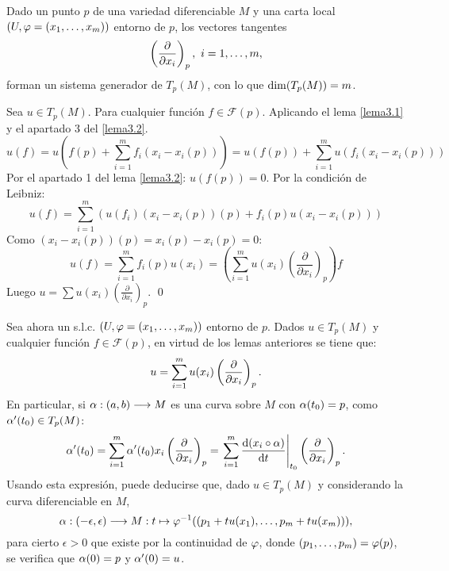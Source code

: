 \documentclass[Cursovd_portada.tex]{subfiles}
\begin{document}
\begin{lemma}\label{lema3.3}
Dado un punto $p$ de una variedad diferenciable $M$ y una carta local $(U,\varphi=(x_1,\dots ,x_m))$ entorno de $p$,
los vectores tangentes
$$\left(\displaystyle{\frac{\partial}{\partial x_i}}\right)_p,\mbox{ }i=1,\dots ,m,$$
forman un sistema generador de $T_p(M)$, con lo que ${\rm dim}(T_p(M))=m$.
\end{lemma}
\begin{dem}
Sea $u \in T_p(M)$. Para cualquier función $f \in \mathcal{F}(p)$. Aplicando el lema \ref{lema3.1} y el apartado 3 del \ref{lema3.2}.
\[ u(f) = u(f(p)+\sum_{i=1}^m f_i(x_i-x_i(p))) = u(f(p)) + \sum_{i=1}^m u(f_i(x_i-x_i(p))) \]
Por el apartado 1 del lema \ref{lema3.2}: $u(f(p))=0$. Por la condición de Leibniz:
\[ u(f) = \sum_{i=1}^m ( u(f_i)(x_i-x_i(p))(p) + f_i(p) u(x_i-x_i(p))) \]
Como $(x_i-x_i(p))(p)=x_i(p)-x_i(p)=0$:
\[ u(f) = \sum_{i=1}^m f_i(p) u(x_i) = \left(\sum_{i=1}^m u(x_i) \left(\frac{\partial}{\partial x_i}\right)_p\right)f \]
Luego $u = \sum u(x_i) \left(\frac{\partial}{\partial x_i}\right)_p$.
\qed
\end{dem}
Sea ahora un s.l.c. $(U,\varphi=(x_1,\dots ,x_m))$ entorno de $p$. Dados $u\in T_p(M)$ y cualquier función
$f\in\mathcal{F}(p)$, en virtud de los lemas anteriores se tiene que:
$$u=\sum_{i=1}^mu(x_i)\left(\displaystyle{\frac{\partial}{\partial x_i}}\right)_p.$$
\hs En particular, si $\alpha:(a,b)\longrightarrow M$ es una curva sobre $M$ con $\alpha(t_0)=p$, como $\alpha'(t_0)\in T_p(M)$:
$$\alpha'(t_0)=\sum_{i=1}^m\alpha'(t_0)x_i\left(\displaystyle{\frac{\partial}{\partial x_i}}\right)_p=
\left.\sum_{i=1}^m\displaystyle{\frac{{\rm d} (x_i\circ\alpha)}{{\rm d} t}}\right|_{t_0}\left(\displaystyle{\frac{\partial}{\partial x_i}}\right)_p.$$ \hs Usando esta expresión, puede
deducirse que, dado $u\in T_p(M)$ y considerando la curva diferenciable en $M$,
$$\alpha:(-\epsilon,\epsilon)\longrightarrow M:t\mapsto \varphi^{-1}((p_1+tu(x_1),\dots ,p_m+tu(x_m))),$$
para cierto $\epsilon>0$ que existe por la continuidad de $\varphi$, donde $(p_1,\dots ,p_m)=\varphi(p)$, se verifica que
$\alpha(0)=p$ y $\alpha'(0)=u$.
\end{document}
